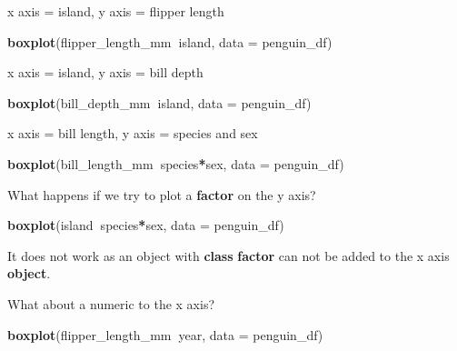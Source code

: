 \documentclass[]{book}
\newenvironment{Shaded}{\begin{snugshade}}{\end{snugshade}}
\newcommand{\KeywordTok}[1]{\textcolor[rgb]{0.13,0.29,0.53}{\textbf{#1}}}
\newcommand{\DataTypeTok}[1]{\textcolor[rgb]{0.13,0.29,0.53}{#1}}
\newcommand{\OperatorTok}[1]{\textcolor[rgb]{0.81,0.36,0.00}{\textbf{#1}}}
\newcommand{\NormalTok}[1]{#1}
\begin{document}
x axis = island, y axis = flipper length

\begin{Shaded}
\begin{Highlighting}[]
\KeywordTok{boxplot}\NormalTok{(flipper_length_mm}\OperatorTok{~}\NormalTok{island, }\DataTypeTok{data =}\NormalTok{ penguin_df)}
\end{Highlighting}
\end{Shaded}

x axis = island, y axis = bill depth

\begin{Shaded}
\begin{Highlighting}[]
\KeywordTok{boxplot}\NormalTok{(bill_depth_mm}\OperatorTok{~}\NormalTok{island, }\DataTypeTok{data =}\NormalTok{ penguin_df)}
\end{Highlighting}
\end{Shaded}

x axis = bill length, y axis = species and sex

\begin{Shaded}
\begin{Highlighting}[]
\KeywordTok{boxplot}\NormalTok{(bill_length_mm}\OperatorTok{~}\NormalTok{species}\OperatorTok{*}\NormalTok{sex, }\DataTypeTok{data =}\NormalTok{ penguin_df)}
\end{Highlighting}
\end{Shaded}

What happens if we try to plot a \textbf{factor} on the y axis?

\begin{Shaded}
\begin{Highlighting}[]
\KeywordTok{boxplot}\NormalTok{(island}\OperatorTok{~}\NormalTok{species}\OperatorTok{*}\NormalTok{sex, }\DataTypeTok{data =}\NormalTok{ penguin_df)}
\end{Highlighting}
\end{Shaded}

It does not work as an object with \textbf{class} \textbf{factor} can
not be added to the x axis \textbf{object}.

What about a numeric to the x axis?

\begin{Shaded}
\begin{Highlighting}[]
\KeywordTok{boxplot}\NormalTok{(flipper_length_mm}\OperatorTok{~}\NormalTok{year, }\DataTypeTok{data =}\NormalTok{ penguin_df)}
\end{Highlighting}
\end{Shaded}
\end{document}
